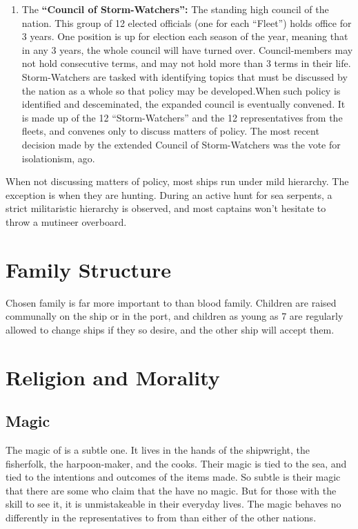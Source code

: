 \documentclass[blue]{GL2020}
\begin{document}
\begin{enumerate}
		\item The {\bf``Council of Storm-Watchers'':} The standing high council of the \pShip{} nation. This group of 12 elected officials (one for each ``Fleet'') holds office for 3 years. One position is up for election each season of the year, meaning that in any 3 years, the whole council will have turned over. Council-members may not hold consecutive terms, and may not hold more than 3 terms in their life. Storm-Watchers are tasked with identifying topics that must be discussed by the nation as a whole so that policy may be developed.When such policy is identified and desceminated, the expanded council is eventually convened. It is made up of the 12 ``Storm-Watchers'' and the 12 representatives from the fleets, and convenes only to discuss matters of policy. The most recent decision made by the extended Council of Storm-Watchers was the vote for isolationism, \pIsolation{} ago.
\end{enumerate}

When not discussing matters of policy, most ships run under mild hierarchy. The exception is when they are hunting. During an active hunt for sea serpents, a strict militaristic hierarchy is observed, and most captains won't hesitate to throw a mutineer overboard.

\section*{Family Structure}
Chosen family is far more important to \pShippies{} than blood family. Children are raised communally on the ship or in the port, and children as young as 7 are regularly allowed to change ships if they so desire, and the other ship will accept them.

\section*{Religion and Morality}

\subsection*{Magic}
The magic of \pShip{} is a subtle one. It lives in the hands of the shipwright, the fisherfolk, the harpoon-maker, and the cooks. Their magic is tied to the sea, and tied to the intentions and outcomes of the items made. So subtle is their magic that there are some who claim that the \pShippies{} have no magic. But for those with the skill to see it, it is unmistakeable in their everyday lives. The magic behaves no differently in the representatives to \pSchool{} from \pShip{} than either of the other nations.
\end{document}
